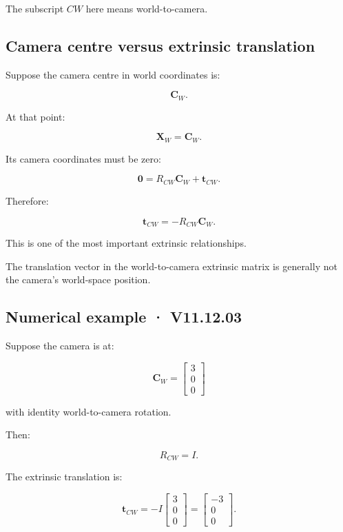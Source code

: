 The subscript \(CW\) here means world-to-camera.

\subsection{Camera centre versus extrinsic translation}\label{02-foundations-ii-ch035-camera-centre-versus-extrinsic-translation}

Suppose the camera centre in world coordinates is:

\[
 \mathbf C_W.
\]

At that point:

\[
 \mathbf X_W=\mathbf C_W.
\]

Its camera coordinates must be zero:

\[
 \mathbf0=R_{CW}\mathbf C_W+\mathbf t_{CW}.
\]

Therefore:

\[
 \boxed{ \mathbf t_{CW}=-R_{CW}\mathbf C_W }.
\]

This is one of the most important extrinsic relationships.

The translation vector in the world-to-camera extrinsic matrix is generally not the camera's world-space position.

\subsection{Numerical example · V11.12.03}\label{02-foundations-ii-ch035-numerical-example-v11.12.03}

Suppose the camera is at:

\[
 \mathbf C_W= \begin{bmatrix}3\\0\\0\end{bmatrix}
\]

with identity world-to-camera rotation.

Then:

\[
 R_{CW}=I.
\]

The extrinsic translation is:

\[
 \mathbf t_{CW}= -I \begin{bmatrix}3\\0\\0\end{bmatrix} = \begin{bmatrix}-3\\0\\0\end{bmatrix}.
\]

